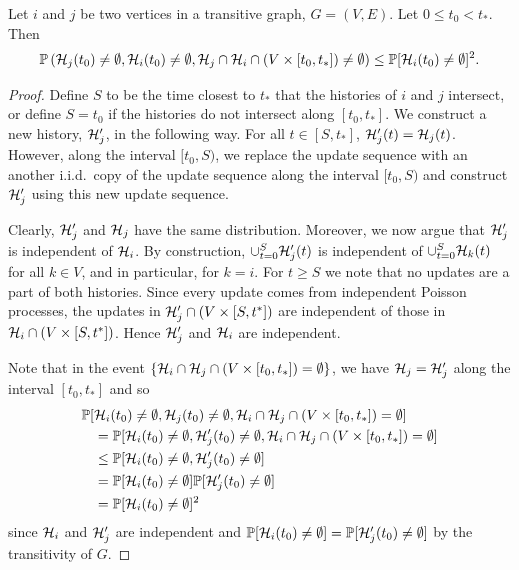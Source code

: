 	\begin{lemma}
	\label{lem:prob Xj Xi and no intersect}
		Let $i$ and $j$ be two vertices in a transitive graph, $G = (V, E)$. Let $0 \leq t_0 < t_*$. Then
		\begin{equation}
			\mathbb{P}\left(\mathcal{H}_j(t_0) \neq \emptyset, \mathcal{H}_i(t_0) \neq \emptyset, \mathcal{H}_j \cap \mathcal{H}_i \cap (V \times [t_0, t_*]) \neq \emptyset \right) \leq \mathbb{P}[\mathcal{H}_i(t_0) \neq \emptyset]^2.
		\end{equation}
	\end{lemma}
	\begin{proof}
		Define $S$ to be the time closest to $t_*$ that the histories of $i$ and $j$ intersect, or define $S = t_0$ if the histories do not intersect along $[t_0, t_*]$. We construct a new history, $\mathcal{H}_j'$, in the following way. For all $t \in [S, t_*]$, $\mathcal{H}_j'(t) = \mathcal{H}_j(t)$. However, along the interval $[t_0, S)$, we replace the update sequence with an another i.i.d.\ copy of the update sequence along the interval $[t_0, S)$ and construct $\mathcal{H}_j'$ using this new update sequence. 

		Clearly, $\mathcal{H}_j'$ and $\mathcal{H}_j$ have the same distribution. Moreover, we now argue that $\mathcal{H}_j'$ is independent of $\mathcal{H}_i$. By construction, $\cup_{t = 0}^S \mathcal{H}_j'(t)$ is independent of $\cup_{t=0}^S \mathcal{H}_k(t)$ for all $k \in V$, and in particular, for $k = i$. 
		For $t \geq S$ we note that no updates are a part of both histories. Since every update comes from independent Poisson processes, the updates in $\mathcal{H}_j' \cap (V \times [S, t^*])$ are independent of those in $\mathcal{H}_i \cap (V \times [S, t^*])$. Hence $\mathcal{H}_j'$ and $\mathcal{H}_i$ are independent.

		Note that in the event $\{\mathcal{H}_i \cap \mathcal{H}_j \cap (V \times [t_0, t_*]) = \emptyset\}$, we have $\mathcal{H}_j = \mathcal{H}_j'$ along the interval $[t_0, t_*]$ and so
		\begin{align}
			\mathbb{P}[&\mathcal{H}_i(t_0) \neq \emptyset, \mathcal{H}_j(t_0) \neq \emptyset, \mathcal{H}_i \cap \mathcal{H}_j \cap (V \times [t_0, t_*]) = \emptyset] \notag \\
			&= \mathbb{P}[\mathcal{H}_i(t_0) \neq \emptyset, \mathcal{H}_j'(t_0) \neq \emptyset, \mathcal{H}_i \cap \mathcal{H}_j \cap (V \times [t_0, t_*]) = \emptyset]\\
			&\leq \mathbb{P}[\mathcal{H}_i(t_0) \neq \emptyset, \mathcal{H}_j'(t_0) \neq \emptyset]\\
			&= \mathbb{P}[\mathcal{H}_i(t_0) \neq \emptyset] \mathbb{P}[\mathcal{H}_j'(t_0) \neq \emptyset]\\
			&= \mathbb{P}[\mathcal{H}_i(t_0) \neq \emptyset]^2
		\end{align}
		since $\mathcal{H}_i$ and $\mathcal{H}_j'$ are independent and $\mathbb{P}[\mathcal{H}_i(t_0) \neq \emptyset] = \mathbb{P}[\mathcal{H}_j'(t_0) \neq \emptyset]$ by the transitivity of $G$.
	\end{proof}
